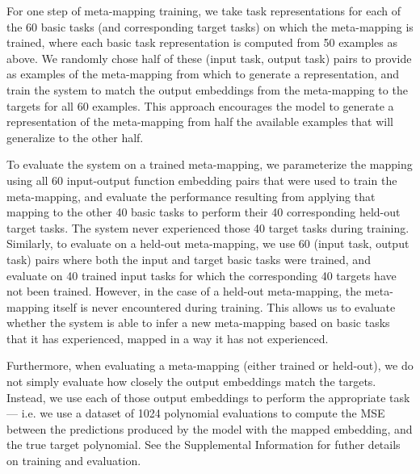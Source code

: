 For one step of meta-mapping training, we take task representations for each of the 60 basic tasks (and corresponding target tasks) on which the meta-mapping is trained, where each basic task representation is computed from 50 examples as above. We randomly chose half of these (input task, output task) pairs to provide as examples of the meta-mapping from which to generate a representation, and train the system to match the output embeddings from the meta-mapping to the targets for all 60 examples. This approach encourages the model to generate a representation of the meta-mapping from half the available examples that will generalize to the other half.

To evaluate the system on a trained meta-mapping, we parameterize the mapping using all 60 input-output function embedding pairs that were used to train the meta-mapping, and evaluate the performance resulting from applying that mapping to the other 40 basic tasks to perform their 40 corresponding held-out target tasks. The system never experienced those 40 target tasks during training. Similarly, to evaluate on a held-out meta-mapping, we use 60 (input task, output task) pairs where both the input and target basic tasks were trained, and evaluate on 40 trained input tasks for which the corresponding 40 targets have not been trained. However, in the case of a held-out meta-mapping, the meta-mapping itself is never encountered during training. This allows us to evaluate whether the system is able to infer a new meta-mapping based on basic tasks that it has experienced, mapped in a way it has not experienced. 

Furthermore, when evaluating a meta-mapping (either trained or held-out), we do not simply evaluate how closely the output embeddings match the targets. Instead, we use each of those output embeddings to perform the appropriate task --- i.e. we use a dataset of 1024 polynomial evaluations to compute the MSE between the predictions produced by the model with the mapped embedding, and the true target polynomial. See the Supplemental Information for futher details on training and evaluation.

